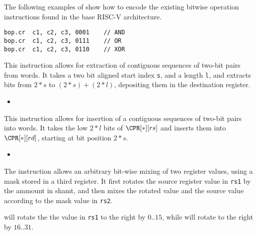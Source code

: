 The following examples of  show how to encode the existing
bitwise operation instructions found in the base RISC-V architecture.

\begin{lstlisting}[style=float]
bop.cr  c1, c2, c3, 0001    // AND
bop.cr  c1, c2, c3, 0111    // OR 
bop.cr  c1, c2, c3, 0110    // XOR
\end{lstlisting}



This instruction allows for extraction of contiguous sequences of two-bit
pairs from words. It takes a two bit aligned start index {\tt s}, and a length
{\tt l}, and extracts bits from $2*s$ to $(2*s)+(2*l)$, depositing them in
the destination register.

\begin{itemize}
\item {}
\end{itemize}


This instruction allows for insertion of a contiguous sequences of two-bit
pairs into words. It takes the low $2*l$ bits of $\CPR[*][rs]$ and inserts them
into $\CPR[*][rd]$, starting at bit position $2*s$.

\begin{itemize}
\item {}
\end{itemize}


The  instruction allows an arbitrary bit-wise mixing of two
register values, using a mask stored in a third register. It first rotates 
the source register value in {\tt rs1} by the ammount in shamt, and then mixes
the rotated value and the source value according to the mask value in
{\tt rs2}.

 will rotate the the value in {\tt rs1} to the right by $0..15$,
while  will rotate to the right by $16..31$. 

